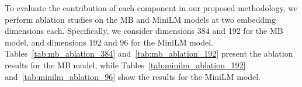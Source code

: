 To evaluate the contribution of each component in our proposed methodology, we perform ablation studies on the MB and MiniLM models at two embedding dimensions each. Specifically, we consider dimensions 384 and 192 for the MB model, and dimensions 192 and 96 for the MiniLM model. Tables~\ref{tab:mb_ablation_384} and~\ref{tab:mb_ablation_192} present the ablation results for the MB model, while Tables~\ref{tab:minilm_ablation_192} and~\ref{tab:minilm_ablation_96} show the results for the MiniLM model.
\begin{table}[ht]
\caption{Ablation study for MB model at 384 dimensions.}
\label{tab:mb_ablation_384}
\centering
{}
\end{table}

